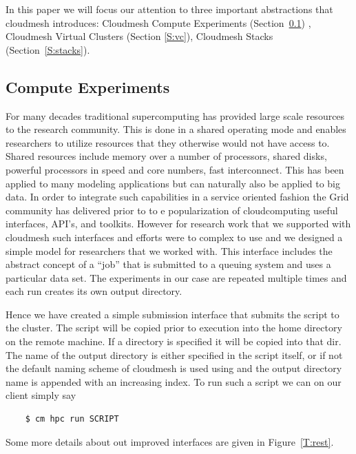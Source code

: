In this paper we will focus our attention to three important
abstractions that cloudmesh introduces: Cloudmesh Compute Experiments
(Section~\ref{S:experiments}) , Cloudmesh Virtual Clusters (Section
\ref{S:vc}), Cloudmesh Stacks (Section~\ref{S:stacks}).

\subsection{Compute Experiments} \label{S:experiments}

For many decades traditional supercomputing has provided large scale
resources to the research community. This is done in a shared
operating mode and enables researchers to utilize resources that they
otherwise would not have access to. Shared resources include
memory over a number of processors, shared disks, powerful processors
in speed and core numbers, fast interconnect. This has been applied to
many modeling applications but can naturally also be applied to big
data. In order to integrate such capabilities in a service oriented
fashion the Grid community has delivered prior to to e popularization
of cloudcomputing useful interfaces, API's, and toolkits. However for
research work that we supported with cloudmesh such interfaces and
efforts were to complex to use and we designed a simple model for
researchers that we worked with. This interface includes the abstract
concept of a ``job'' that is submitted to a queuing system and uses a
particular data set. The experiments in our case are repeated multiple
times and each run creates its own output directory.

Hence we have created a simple submission interface that submits the
script to the cluster. The script will be copied prior to execution
into the home directory on the remote machine. If a directory is
specified it will be copied into that dir.  The name of the output
directory is either specified in the script itself, or if not the
default naming scheme of cloudmesh is used using and the output
directory name is appended with an increasing index. To run such a
script we can on our client simply say
 
\begin{Verbatim}
    $ cm hpc run SCRIPT
\end{Verbatim}

Some more details about out improved interfaces are given in
Figure~\ref{T:rest}.

